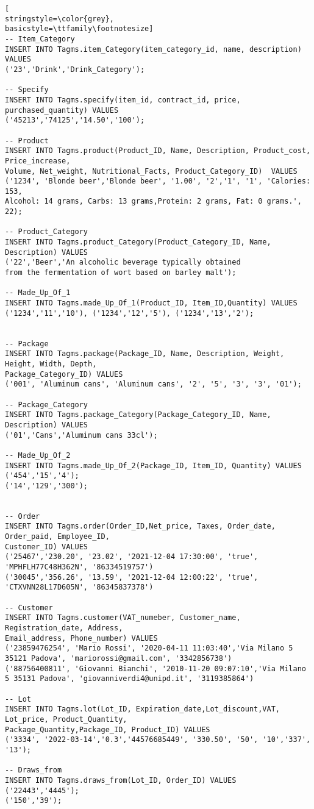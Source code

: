 \begin{lstlisting}[
stringstyle=\color{grey},
basicstyle=\ttfamily\footnotesize]
-- Item_Category
INSERT INTO Tagms.item_Category(item_category_id, name, description) VALUES
('23','Drink','Drink_Category');

-- Specify
INSERT INTO Tagms.specify(item_id, contract_id, price, purchased_quantity) VALUES
('45213','74125','14.50','100');

-- Product
INSERT INTO Tagms.product(Product_ID, Name, Description, Product_cost, Price_increase,
Volume, Net_weight, Nutritional_Facts, Product_Category_ID)  VALUES 
('1234', 'Blonde beer','Blonde beer', '1.00', '2','1', '1', 'Calories: 153, 
Alcohol: 14 grams, Carbs: 13 grams,Protein: 2 grams, Fat: 0 grams.', 22);

-- Product_Category
INSERT INTO Tagms.product_Category(Product_Category_ID, Name, Description) VALUES 
('22','Beer','An alcoholic beverage typically obtained 
from the fermentation of wort based on barley malt');

-- Made_Up_Of_1
INSERT INTO Tagms.made_Up_Of_1(Product_ID, Item_ID,Quantity) VALUES
('1234','11','10'), ('1234','12','5'), ('1234','13','2');


-- Package
INSERT INTO Tagms.package(Package_ID, Name, Description, Weight, Height, Width, Depth, 
Package_Category_ID) VALUES
('001', 'Aluminum cans', 'Aluminum cans', '2', '5', '3', '3', '01');

-- Package_Category
INSERT INTO Tagms.package_Category(Package_Category_ID, Name, Description) VALUES 
('01','Cans','Aluminum cans 33cl');

-- Made_Up_Of_2
INSERT INTO Tagms.made_Up_Of_2(Package_ID, Item_ID, Quantity) VALUES
('454','15','4');
('14','129','300');


-- Order
INSERT INTO Tagms.order(Order_ID,Net_price, Taxes, Order_date, Order_paid, Employee_ID, 
Customer_ID) VALUES 
('25467','230.20', '23.02', '2021-12-04 17:30:00', 'true', 'MPHFLH77C48H362N', '86334519757')
('30045','356.26', '13.59', '2021-12-04 12:00:22', 'true', 'CTXVNN28L17D605N', '86345837378')

-- Customer
INSERT INTO Tagms.customer(VAT_numeber, Customer_name, Registration_date, Address, 
Email_address, Phone_number) VALUES
('23859476254', 'Mario Rossi', '2020-04-11 11:03:40','Via Milano 5 35121 Padova', 'mariorossi@gmail.com', '3342856738')
('88756400811', 'Giovanni Bianchi', '2010-11-20 09:07:10','Via Milano 5 35131 Padova', 'giovanniverdi4@unipd.it', '3119385864')

-- Lot
INSERT INTO Tagms.lot(Lot_ID, Expiration_date,Lot_discount,VAT, Lot_price, Product_Quantity, 
Package_Quantity,Package_ID, Product_ID) VALUES 
('3334', '2022-03-14','0.3','44576685449', '330.50', '50', '10','337', '13');

-- Draws_from
INSERT INTO Tagms.draws_from(Lot_ID, Order_ID) VALUES 
('22443','4445');
('150','39');

\end{lstlisting}